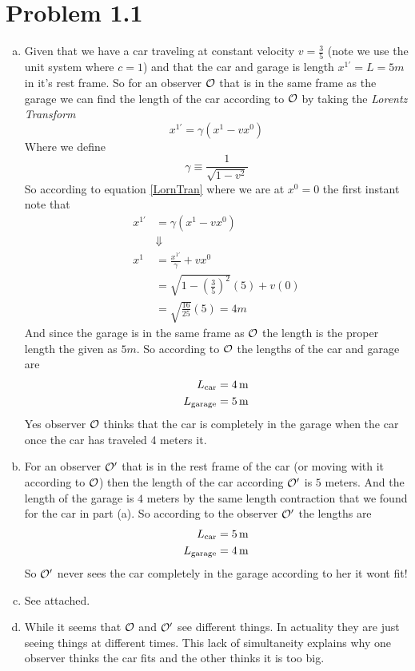 \documentclass[11pt]{article}
\numberwithin{equation}{section}
\begin{document}


\section{Problem 1.1}
\begin{enumerate}[(a)]
\item
Given that we have a car traveling at constant velocity $v = \frac{3}{5}$ (note we use the unit system where $c=1$) and that the car and garage is length $x^{1'} = L=5\unit{m}$ in it's rest frame. So for an observer $\mathcal{O}$ that is in the same frame as the garage we can find the length of the car according to $\mathcal{O}$ by taking the \emph{Lorentz Transform}
\begin{equation}
x^{1'} = \gamma(x^1-vx^0)
\label{LornTran}
\end{equation}
Where we define 
$$\gamma \equiv \frac{1}{\sqrt{1-v^2}}$$
So according to equation \ref{LornTran} where we are at $x^0 = 0$ the first instant note that 
\begin{align*}
x^{1'} &= \gamma(x^1-vx^0)\\
&\Downarrow\\
x^1 &= \frac{x^{1'}}{\gamma}+vx^0\\
 &= \sqrt{1-\left(\frac{3}{5}\right)^2}(5)+v(0)\\
 &= \sqrt{\frac{16}{25}}(5) = 4\unit{m}
\end{align*}
And since the garage is in the same frame as $\mathcal{O}$ the length is the proper length the given as $5\unit{m}$. So according to $\mathcal{O}$ the lengths of the car and garage are
\begin{align*}
L_{\textnormal{car}} &= 4\, \mathrm{m}\\
L_{\textnormal{garage}} &= 5\, \mathrm{m}
\end{align*}
Yes observer $\mathcal{O}$ thinks that the car is completely in the garage when the car once the car has traveled 4 meters it.

\item
For an observer $\mathcal{O}'$ that is in the rest frame of the car (or moving with it according to $\mathcal{O}$) then the length of the car according $\mathcal{O}'$ is $5$ meters. And the length of the garage is $4$ meters by the same length contraction that we found for the car in part (a). So according to the observer $\mathcal{O}'$ the lengths are
\begin{align*}
L_{\textnormal{car}} &= 5\, \mathrm{m}\\
L_{\textnormal{garage}} &= 4\, \mathrm{m}
\end{align*}
So $\mathcal{O}'$ never sees the car completely in the garage according to her it wont fit!

\item
See attached.

\item
While it seems that $\mathcal{O}$ and $\mathcal{O}'$ see different things. In actuality they are just seeing things at different times. This lack of simultaneity explains why one observer thinks the car fits and the other thinks it is too big.
\end{enumerate}
\end{document}
